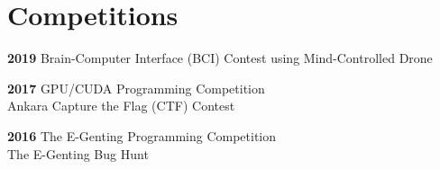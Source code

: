 \section{Competitions}
\vspace{-0.2cm}
\textbf{2019}
    \vspace{0.1mm} {\quad \quad Brain-Computer Interface (BCI) Contest using Mind-Controlled Drone} 
    
\textbf{2017}
    \vspace{0.1mm} {\quad \quad GPU/CUDA Programming Competition} \\
    \vspace{0.1mm} {\quad \quad \quad \quad Ankara Capture the Flag (CTF) Contest}
    
\textbf{2016}   
    \vspace{0.1mm} {\quad \quad The E-Genting Programming Competition} \\
    \vspace{0.1mm} {\quad \quad \quad \quad The E-Genting Bug Hunt}